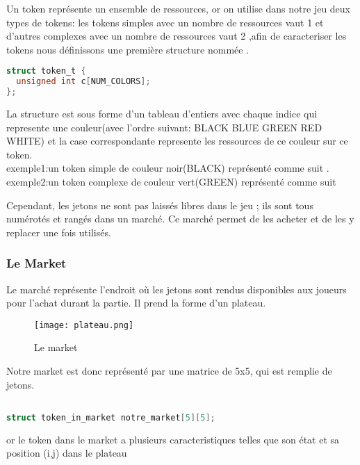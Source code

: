 \documentclass{article}
\begin{document}
\hspace{1em} Un token représente un ensemble de ressources, or on utilise dans notre jeu deux types  de tokens: les tokens simples avec un nombre de ressources vaut 1 et d'autres complexes avec un nombre de ressources vaut 2 ,afin de caracteriser les tokens nous définissons une première structure nommée .


\begin{tcolorbox}[colback=gray!10,colframe=white!75!black]

\begin{lstlisting}[language=C, caption={La structure caracterisant un  Token}, 
label={lst:exemple1-c}]
struct token_t {
  unsigned int c[NUM_COLORS];
};
\end{lstlisting}
\end{tcolorbox}

La structure est sous forme d'un tableau d'entiers avec chaque indice qui represente une couleur(avec l'ordre suivant: BLACK BLUE GREEN RED WHITE) et la case correspondante represente les ressources de ce couleur sur ce token.\\ 

\vspace{1em}exemple1:un token simple de couleur noir(BLACK) représenté comme suit .\\
 
\vspace{1em}
exemple2:un token complexe de couleur vert(GREEN) représenté comme suit 

Cependant, les jetons ne sont pas laissés libres dans le jeu ; ils sont tous numérotés et rangés dans un marché. Ce marché permet de les acheter et de les y replacer une fois utilisés.
\subsubsection{Le Market}
 Le marché représente l'endroit où les jetons sont rendus disponibles aux joueurs pour l'achat durant la partie. Il prend la forme d'un plateau.
\begin{figure}[ht]
    \centering
    \texttt{[image: plateau.png]}
    \caption{Le market}
    \label{fig:PLATEAU}
\end{figure}

Notre market est donc  représenté par une matrice de 5x5, qui est remplie de jetons.
\begin{tcolorbox}[colback=white!5,colframe=white!75!black]

\begin{lstlisting}[language=C, caption={le plateau}, label={lst:exemple6-c}]

struct token_in_market notre_market[5][5];
\end{lstlisting}
\end{tcolorbox}
or le token dans le market a plusieurs caracteristiques telles que son état et sa position (i,j) dans le plateau 
\end{document}
